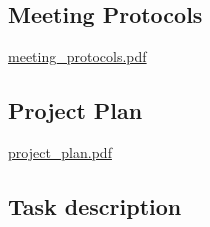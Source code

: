 \documentclass[a4paper]{scrartcl}
\begin{document}
\subsection{Meeting Protocols}
	\href{meeting\_protocols.pdf}{meeting\_protocols.pdf}

\subsection{Project Plan}
	\href{./project\_plan.pdf}{project\_plan.pdf}


\subsection{Task description}



\end{document}
